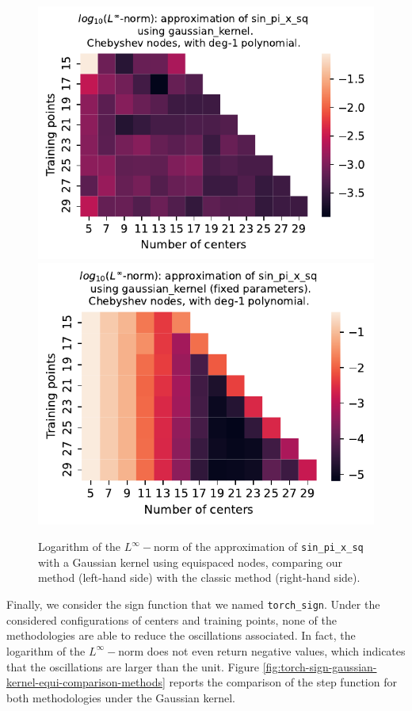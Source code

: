 \documentclass[12pt]{report} %
\begin{document}
\begin{figure}[ht]
    \centering
    \includegraphics[width=.49\textwidth]{imagenes/experiments/1d/variational/sin_pi_x_sq-Kgaussian_kernel-Poly-Cheb.pdf}
    \includegraphics[width=.49\textwidth]{imagenes/experiments/1d/least_squares/opt-sin_pi_x_sq-Kgaussian_kernel-Poly-Cheb.pdf}
    \caption{Logarithm of the $L^\infty-$norm of the approximation of \texttt{sin\_pi\_x\_sq} with a Gaussian kernel using equispaced nodes, comparing our method (left-hand side) with the classic method (right-hand side).}
    \label{fig:sin-pi-x-sq-gaussian-kernel-cheb-poly-comparison-methods}
\end{figure}


Finally, we consider the sign function that we named \texttt{torch\_sign}. Under the considered configurations of centers and training points, none of the methodologies are able to reduce the oscillations associated. In fact, the logarithm of the $L^\infty-$norm does not even return negative values, which indicates that the oscillations are larger than the unit. Figure \ref{fig:torch-sign-gaussian-kernel-equi-comparison-methods} reports the comparison of the step function for both methodologies under the Gaussian kernel.
\end{document}
